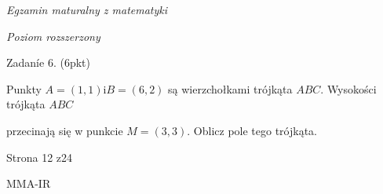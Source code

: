 \documentclass[a4paper,12pt]{article}
\begin{document}
{\it Egzamin maturalny z matematyki}

{\it Poziom rozszerzony}

Zadaníe 6. (6pkt)

Punkty $A=(1,1) \mathrm{i} B=(6,2)$ są wierzchołkami trójkąta $ABC$. Wysokości trójkąta $ABC$

przecinają się w punkcie $M=(3,3)$. Oblicz pole tego trójkąta.

Strona 12 z24

MMA-IR
\end{document}
